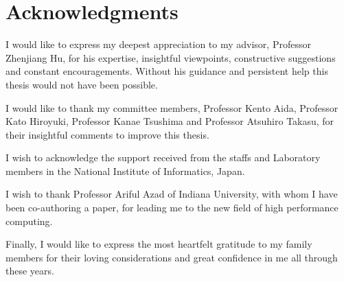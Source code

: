 \documentclass{sokendai_thesis} %
\begin{document}

%




\chapter*{Acknowledgments}

I would like to express my deepest appreciation to my advisor, Professor Zhenjiang Hu, for his expertise, insightful viewpoints, constructive suggestions and constant encouragements.
Without his guidance and persistent help this thesis would not have been possible.


I would like to thank my committee members, Professor Kento Aida, Professor Kato Hiroyuki, Professor Kanae Tsushima and Professor Atsuhiro Takasu, for their insightful comments to improve this thesis.


I wish to acknowledge the support received from the staffs and Laboratory members in the National Institute of Informatics, Japan.


I wish to thank Professor Ariful Azad of Indiana University, with whom I have been co-authoring a paper, for leading me to the new field of high performance computing.

Finally, I would like to express the most heartfelt gratitude to my family members for their loving considerations and great confidence in me all through these years.
\end{document}
